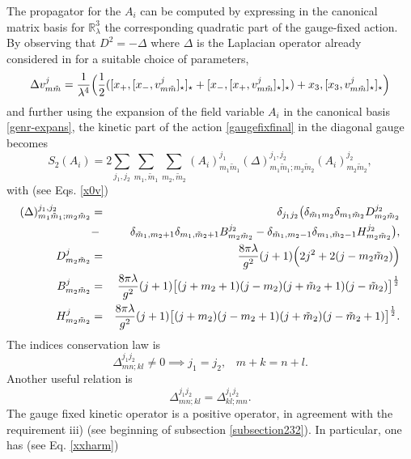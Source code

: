 \documentclass[11pt]{book}
\newcommand{\Rbb}{\mathbb{R}}
\theoremstyle{break}
\begin{document}
The propagator for the $A_i$ can be computed by expressing in the canonical matrix basis for $\Rbb^3_\lambda$ the corresponding quadratic part of the gauge-fixed action. By observing that  $
D^2=-\Delta$ where $\Delta$ is the Laplacian operator already considered  in \cite{vit-wal-12} for a suitable choice of parameters, 
\begin{equation}
\Delta v^j_{m\tilde m}= \frac{1}{\lambda^4} \Bigl( \frac{1}{2}( [x_+,[x_-, v^j_{m\tilde m}]_\star]_\star + [x_-,[x_+, v^j_{m\tilde m}]_\star]_\star )+ x_3,[x_3, v^j_{m\tilde m}]_\star]_\star \Bigr)
\end{equation}
and further using the expansion of the field variable $A_i$ in the canonical basis \eqref{genr-expans},
the kinetic part of the action \eqref{gaugefixfinal} in the diagonal gauge becomes
\begin{equation}
S_2(A_i)=2\sum_{j_1,j_2}\sum_{m_1,\tilde m_1}\sum_{m_2,\tilde m_2}(A_i)^{j_1}_{m_1\tilde m_1}(\Delta)^{j_1,j_2}_{m_1\tilde m_1;m_2\tilde m_2}    (A_i)^{j_2}_{m_2 \tilde m_2}\label{quadrat-matrix},
\end{equation}
with (see Eqs. \eqref{x0v})
\begin{eqnarray}
(\Delta)^{j_1,j_2}_{m_1\tilde m_1;m_2\tilde m_2}&=&\delta_{j_1j_2}\big(\delta_{\tilde m_1m_2}\delta_{m_1\tilde m_2}D^{j_2}_{m_2\tilde m_2}\nonumber\\
&-&\delta_{\tilde m_1,m_2+1}\delta_{m_1,\tilde m_2+1}B^{j_2}_{m_2\tilde m_2}-\delta_{\tilde m_1,m_2-1}\delta_{m_1,\tilde m_2-1}H^{j_2}_{m_2\tilde m_2}\big),\\
D^{j}_{m_2\tilde m_2}&=& \frac{8\pi\lambda}{g^2}(j+1) \Bigl(2j^2+2(j-m_2\tilde m_2) \Bigr)\\
B^{j}_{m_2\tilde m_2}&=&\frac{8\pi\lambda}{g^2}(j+1) \big[(j+m_2+1)(j-m_2)(j+\tilde m_2+1)(j-\tilde m_2) \big]^{\frac{1}{2}} \\
H^{j}_{m_2\tilde m_2}&=&\frac{8\pi\lambda}{g^2}(j+1) \big[(j+m_2)(j-m_2+1)(j+\tilde m_2)(j-\tilde m_2+1) \big]^{\frac{1}{2}}.
\end{eqnarray}
The indices conservation law \cite{vit-wal-12} is
\begin{equation}
\Delta^{j_1 j_2}_{mn;kl}\ne 0 \implies
    j_1=j_2,\;\;\;  m+k= n+l\label{consindice1}.
\end{equation}
Another useful relation is
\begin{equation}
\Delta^{j_1 j_2}_{mn;kl}=\Delta^{j_1 j_2}_{kl;mn}\label{cons-indiceprim}.
\end{equation}
The gauge fixed kinetic operator is a positive operator, in agreement with the requirement iii) (see beginning of subsection \ref{subsection232}). In particular, one has (see Eq. \eqref{xxharm})
\end{document}
